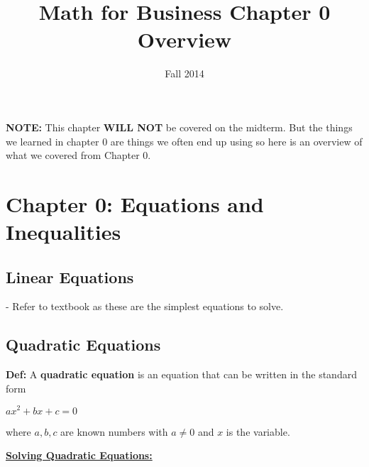 \documentclass[12pt]{article}
\begin{document}
\title{Math for Business Chapter 0 Overview}
\date{Fall 2014}
\maketitle

\textbf{NOTE:} This chapter \textbf{WILL NOT} be covered on the midterm. But the things we learned in chapter 0 are things we often end up using so here is an overview of what we covered from Chapter 0. 

\section{Chapter 0: Equations and Inequalities}
\subsection{Linear Equations}
- Refer to textbook as these are the simplest equations to solve. 
\subsection{Quadratic Equations}

\textbf{Def:}  A \textbf{quadratic equation} is an equation that can be written in the standard form
\newline

\centerline{$ax^2 + bx + c = 0$}

where $a,b,c$ are known numbers with $a \neq 0$ and $x$ is the variable. 

\underline{\textbf{Solving Quadratic Equations:}}
\end{document}
